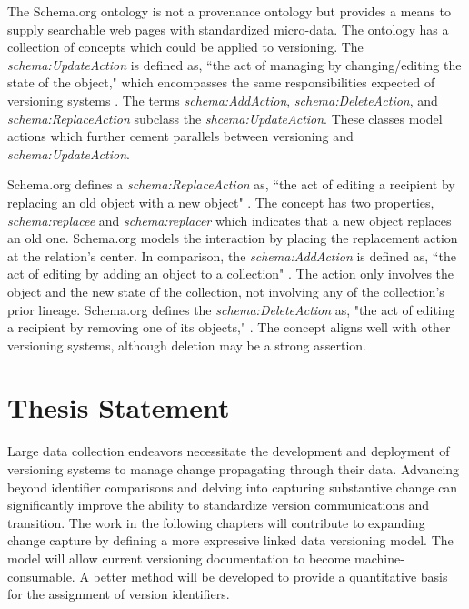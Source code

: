 The Schema.org ontology is not a provenance ontology but provides a means to supply searchable web pages with standardized micro-data.
The ontology has a collection of concepts which could be applied to versioning.
The \textit{schema:UpdateAction} is defined as, ``the act of managing by changing/editing the state of the object," which encompasses the same responsibilities expected of versioning systems \cite{Schema}.
The terms \textit{schema:AddAction}, \textit{schema:DeleteAction}, and \textit{schema:ReplaceAction} subclass the \textit{shcema:UpdateAction}.
These classes model actions which further cement parallels between versioning and \textit{schema:UpdateAction}.

Schema.org defines a \textit{schema:ReplaceAction} as, ``the act of editing a recipient by replacing an old object with a new object" \cite{SchemaRep}.
The concept has two properties, \textit{schema:replacee} and \textit{schema:replacer} which indicates that a new object replaces an old one.
Schema.org models the interaction by placing the replacement action at the relation's center.
In comparison, the \textit{schema:AddAction} is defined as, ``the act of editing by adding an object to a collection" \cite{SchemaAdd}.
The action only involves the object and the new state of the collection, not involving any of the collection's prior lineage.
Schema.org defines the \textit{schema:DeleteAction} as, "the act of editing a recipient by removing one of its objects," \cite{SchemaRem}.
The concept aligns well with other versioning systems, although deletion may be a strong assertion.

\section{Thesis Statement}

Large data collection endeavors necessitate the development and deployment of versioning systems to manage change propagating through their data.
Advancing beyond identifier comparisons and delving into capturing substantive change can significantly improve the ability to standardize version communications and transition.
The work in the following chapters will contribute to expanding change capture by defining a more expressive linked data versioning model.
The model will allow current versioning documentation to become machine-consumable.
A better method will be developed to provide a quantitative basis for the assignment of version identifiers.


